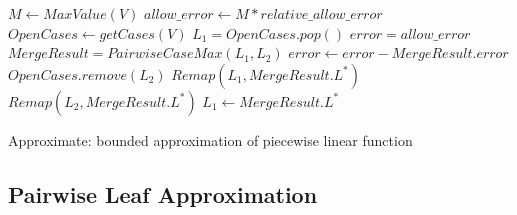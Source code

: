 \incmargin{1.5em}
\linesnumbered
\begin{algorithm}[t!]
\dontprintsemicolon
{}
$M \gets MaxValue(V)$
$allow\_error \gets M * relative\_allow\_error$
$OpenCases \gets getCases(V)$\;
 {
	$L_1 = OpenCases.pop()$\;
	$error = allow\_error$\;
	  { 
		$MergeResult = PairwiseCaseMax( L_1, L_2)$\;
		{
			$error \gets error - MergeResult.error$\;
			$OpenCases.remove(L_2)$\;
			$ Remap(L_1, MergeResult.L^*) $\;
			$ Remap(L_2, MergeResult.L^*) $\;
			$ L_1 \gets MergeResult.L^* $\;
		}
	}
}
\;
\caption{\footnotesize {\sc Approximate}: bounded approximation of piecewise linear function}
\label{alg:approx}
\end{algorithm}
\decmargin{1.5em}

\subsection{Pairwise Leaf Approximation}

%
%

